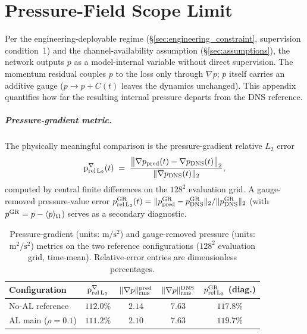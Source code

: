 \chapter{Pressure-Field Scope Limit}
\label{app:pressure_limit}

Per the engineering-deployable regime (\S\ref{sec:engineering_constraint}, supervision condition~1) and the channel-availability assumption (\S\ref{sec:assumptions}), the network outputs $p$ as a model-internal variable without direct supervision. The momentum residual couples $p$ to the loss only through $\nabla p$; $p$ itself carries an additive gauge ($p\to p+C(t)$ leaves the dynamics unchanged). This appendix quantifies how far the resulting internal pressure departs from the DNS reference.

\paragraph{Pressure-gradient metric.}
The physically meaningful comparison is the pressure-gradient relative $L_2$ error
\begin{equation}
    \mathrm{p}^{\nabla}_{\rm rel\,L_2}(t) \;=\; \frac{\big\Vert \nabla p_{\rm pred}(t) - \nabla p_{\rm DNS}(t)\big\Vert_2}{\Vert \nabla p_{\rm DNS}(t)\Vert_2},
\end{equation}
computed by central finite differences on the $128^2$ evaluation grid. A gauge-removed pressure-value error
$p_{\rm rel\,L_2}^{\rm GR}(t) = \Vert p_{\rm pred}^{\rm GR}-p_{\rm DNS}^{\rm GR}\Vert_2/\Vert p_{\rm DNS}^{\rm GR}\Vert_2$
(with $p^{\rm GR} = p - \langle p\rangle_{\Omega}$) serves as a secondary diagnostic.

\begin{table}[!htbp]
    \centering
    \caption{Pressure-gradient (units: $\mathrm{m}/\mathrm{s}^2$) and gauge-removed pressure (units: $\mathrm{m}^2/\mathrm{s}^2$) metrics on the two reference configurations ($128^2$ evaluation grid, time-mean). Relative-error entries are dimensionless percentages.}
    \label{tab:pressure_limit}
    \footnotesize
    \setlength{\tabcolsep}{4pt}
    \begin{tabular}{lcccc}
    \toprule
    \textbf{Configuration} & $\mathrm{p}^{\nabla}_{\rm rel\,L_2}$ & $\Vert\nabla p\Vert_{\rm rms}^{\rm pred}$ & $\Vert\nabla p\Vert_{\rm rms}^{\rm DNS}$ & $p_{\rm rel\,L_2}^{\rm GR}$ (diag.) \\
    \midrule
    No-AL reference        & $112.0\%$ & $2.14$ & $7.63$ & $117.8\%$ \\
    AL main ($\rho=0.1$)   & $111.2\%$ & $2.10$ & $7.63$ & $119.7\%$ \\
    \bottomrule
    \end{tabular}
\end{table}

